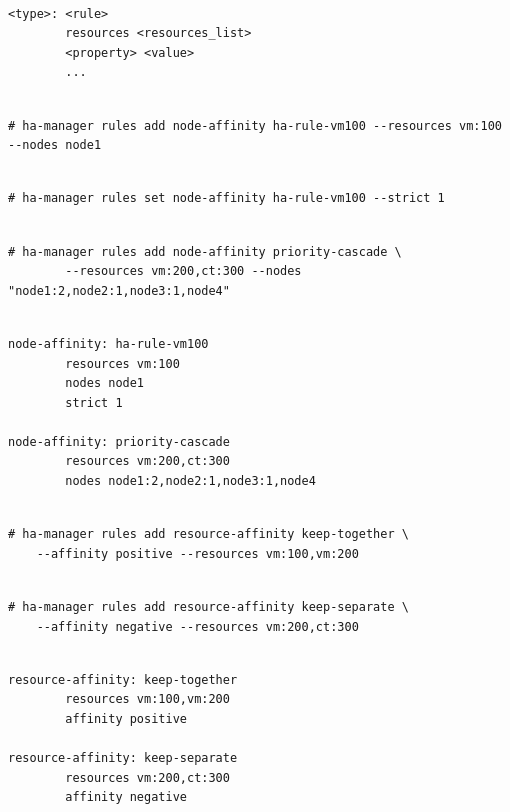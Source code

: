 \begin{lstlisting}

<type>: <rule>
        resources <resources_list>
        <property> <value>
        ...

\end{lstlisting}

\begin{lstlisting}

# ha-manager rules add node-affinity ha-rule-vm100 --resources vm:100 --nodes node1

\end{lstlisting}

\begin{lstlisting}

# ha-manager rules set node-affinity ha-rule-vm100 --strict 1

\end{lstlisting}

\begin{lstlisting}

# ha-manager rules add node-affinity priority-cascade \
        --resources vm:200,ct:300 --nodes "node1:2,node2:1,node3:1,node4"

\end{lstlisting}

\begin{lstlisting}

node-affinity: ha-rule-vm100
        resources vm:100
        nodes node1
        strict 1

node-affinity: priority-cascade
        resources vm:200,ct:300
        nodes node1:2,node2:1,node3:1,node4

\end{lstlisting}

\begin{lstlisting}

# ha-manager rules add resource-affinity keep-together \
    --affinity positive --resources vm:100,vm:200

\end{lstlisting}

\begin{lstlisting}

# ha-manager rules add resource-affinity keep-separate \
    --affinity negative --resources vm:200,ct:300

\end{lstlisting}

\begin{lstlisting}

resource-affinity: keep-together
        resources vm:100,vm:200
        affinity positive

resource-affinity: keep-separate
        resources vm:200,ct:300
        affinity negative

\end{lstlisting}

